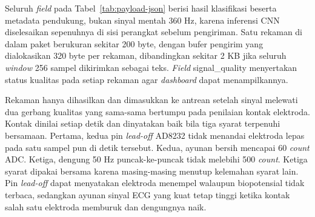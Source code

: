 \begin{center}
\begin{longtable}{p{3.6cm}p{2.0cm}p{7.4cm}}
  \end{longtable}
  \par{}
\end{center}

Seluruh \textit{field} pada Tabel~\ref{tab:payload-json} berisi hasil
klasifikasi beserta metadata pendukung, bukan sinyal mentah 360 Hz, karena
inferensi CNN diselesaikan sepenuhnya di sisi perangkat sebelum pengiriman.
Satu rekaman di dalam paket berukuran sekitar 200 byte, dengan bufer
pengirim yang dialokasikan 320 byte per rekaman, dibandingkan sekitar 2 KB
jika seluruh \textit{window} 256 sampel dikirimkan sebagai teks. \textit{Field}
signal\_quality menyertakan status kualitas pada setiap rekaman agar
\textit{dashboard} dapat menampilkannya.

Rekaman hanya dihasilkan dan dimasukkan ke antrean setelah sinyal melewati dua
gerbang kualitas yang sama-sama bertumpu pada penilaian kontak elektroda.
Kontak dinilai setiap detik dan dinyatakan baik bila tiga syarat terpenuhi
bersamaan. Pertama, kedua pin \textit{lead-off} AD8232 tidak menandai elektroda
lepas pada satu sampel pun di detik tersebut. Kedua, ayunan bersih mencapai 60
\textit{count} ADC. Ketiga, dengung 50 Hz puncak-ke-puncak tidak melebihi 500
\textit{count}. Ketiga syarat dipakai bersama karena masing-masing menutup
kelemahan syarat lain. Pin \textit{lead-off} dapat menyatakan elektroda menempel
walaupun biopotensial tidak terbaca, sedangkan ayunan sinyal ECG yang kuat tetap
tinggi ketika kontak salah satu elektroda memburuk dan dengungnya naik.

